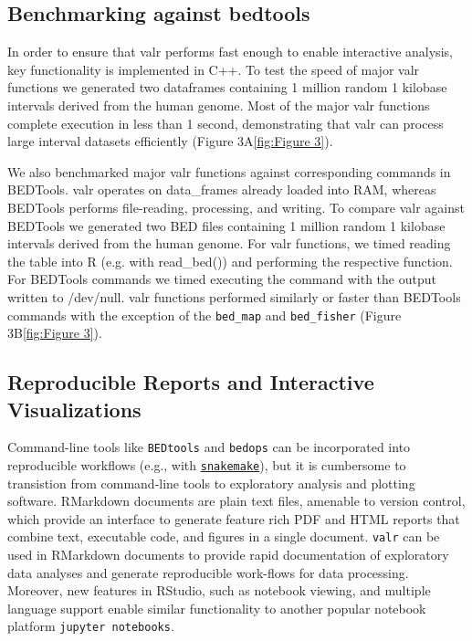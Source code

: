 \documentclass[9pt,a4paper]{extarticle}
\begin{document}
\subsection*{Benchmarking against bedtools}
In order to ensure that valr performs fast enough to enable interactive analysis, key functionality is implemented in C++. To test the speed of major valr functions we generated two dataframes containing 1 million random 1 kilobase intervals derived from the human genome. Most of the major valr functions complete execution in less than 1 second, demonstrating that valr can process large interval datasets efficiently (Figure 3A\ref{fig:Figure 3}).

We also benchmarked major valr functions against corresponding commands in BEDTools. valr operates on data\_frames already loaded into RAM, whereas BEDTools performs file-reading, processing, and writing. To compare valr against BEDTools we generated two BED files containing 1 million random 1 kilobase intervals derived from the human genome. For valr functions, we timed reading the table into R (e.g. with read\_bed()) and performing the respective function. For BEDTools commands we timed executing the command with the output written to /dev/null. valr functions performed similarly or faster than BEDTools commands with the exception of the \texttt{bed\_map} and \texttt{bed\_fisher} (Figure 3B\ref{fig:Figure 3}).

\subsection{Reproducible Reports and Interactive Visualizations}
Command-line tools like \texttt{BEDtools} and \texttt{bedops} can be incorporated into reproducible workflows (e.g., with
\href{https://bitbucket.org/snakemake/snakemake/wiki/Home}{\texttt{snakemake}}\cite{koster_snakemakescalable_2012}),
but it is cumbersome to transistion from command-line tools to exploratory analysis and plotting software. RMarkdown documents are plain text files, amenable to version control, which provide an interface to generate feature rich PDF and HTML reports that combine text, executable code, and figures in a single document. \texttt{valr} can be used in RMarkdown documents to provide rapid documentation of exploratory data analyses and generate reproducible work-flows for data processing.  Moreover, new features in RStudio, such as notebook viewing, and multiple language support enable similar functionality to another popular notebook platform \texttt{jupyter notebooks}.
\end{document}
